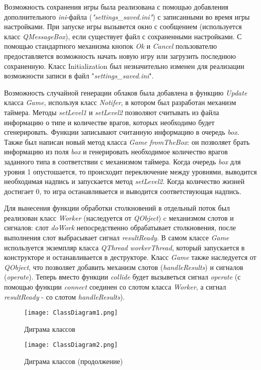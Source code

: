 \documentclass[a4paper,14pt]{article}
\begin{document}
Возможность сохранения игры была реализована с помощью добавления дополнительного \textit{ini}-файла (\textit{"settings\_saved.ini"}) с записанными во время игры настройками. При запуске игры вызывется окно с сообщением (используется класс \textit{QMessageBox}), если существует файл с сохраненными настройками. С помощью стандартного механизма кнопок \textit{Ok} и \textit{Cancel} пользователю предоставляется возможность начать новую игру или загрузить последнюю сохраненную. Класс Initialization был незначительно изменен для реализации возможности записи в файл "\textit{settings\_saved.ini}".

Возможность случайной генерации облаков была добавлена в функцию \textit{Update} класса \textit{Game}, используя класс \textit{Notifer}, в котором был разработан механизм таймера. Методы \textit{setLevel1} и \textit{setLevel2} позволяют считывать из файла информацию о типе и количестве врагов, которых необходимо будет сгенерировать. Функции записывают считанную информацию в очередь \textit{box}. Также был написан новый метод класса \textit{Game} \textit{fromTheBox}: он позволяет брать информацию из поля \textit{box} и генерировать необходимое количество врагов заданного типа в соответствии с механизмом таймера. Когда очередь \textit{box} для уровня 1 опустошается, то происходит переключение между уровнями, выводится необходимая надпись и запускается метод \textit{setLevel2}. Когда количество жизней достигает 0, то игра останавливается и выводится соответствующая надпись.

Для вынесения функции обработки столкновений в отдельный поток был реализован класс \textit{Worker} (наследуется от \textit{QObject}) c механизмом слотов и сигналов: слот \textit{doWork} непосредственно обрабатывает столкновения, после выполнения слот выбрасывает сигнал \textit{resultReady}. В самом классе \textit{Game} используется экземпляр класса \textit{QThread} \textit{workerThread}, который запускается в конструкторе и останавливается в деструкторе. Класс \textit{Game} также наследуется от \textit{QObject}, что позволяет добавить механизм слотов (\textit{handleResults}) и сигналов (\textit{operate}). Теперь вместо функции \textit{collide} будет вызыветься сигнал \textit{operate} (с помощью функции \textit{connect} соединен со слотом класса \textit{Worker}, а сигнал \textit{resultReady} - со слотом \textit{handleResults}).

\begin{figure}[H]
	\centering
	\texttt{[image: ClassDiagram1.png]}
	\caption{Диграма классов}	
\end{figure}
\begin{figure}[H]
	\centering
	\texttt{[image: ClassDiagram2.png]}
	\caption{Диграма классов (продолжение)}	
\end{figure}
\end{document}
